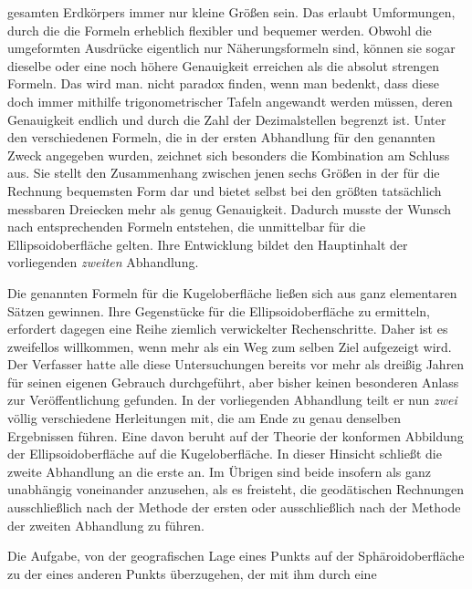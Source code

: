 %
gesamten Erdkörpers immer nur kleine Größen sein. Das erlaubt Umformungen, durch die die Formeln erheblich flexibler und bequemer werden. Obwohl die umgeformten Ausdrücke eigentlich nur Näherungsformeln sind, können sie sogar dieselbe oder eine noch höhere Genauigkeit erreichen als die absolut strengen Formeln. Das wird man. nicht paradox finden, wenn man bedenkt, dass diese doch immer mithilfe trigonometrischer Tafeln angewandt werden müssen, deren Genauigkeit endlich und durch die Zahl der Dezimalstellen begrenzt ist. Unter den verschiedenen Formeln, die in der ersten Abhandlung für den genannten Zweck angegeben wurden, zeichnet sich besonders die Kombination am Schluss aus. Sie stellt den Zusammenhang zwischen jenen sechs Größen in der für die Rechnung bequemsten Form dar und bietet selbst bei den größten tatsächlich messbaren Dreiecken mehr als genug Genauigkeit. Dadurch musste der Wunsch nach entsprechenden Formeln entstehen, die unmittelbar für die Ellipsoidoberfläche gelten. Ihre Entwicklung bildet den Hauptinhalt der vorliegenden \textit{zweiten} Abhandlung.

Die genannten Formeln für die Kugeloberfläche ließen sich aus ganz elementaren Sätzen gewinnen. Ihre Gegenstücke für die Ellipsoidoberfläche zu ermitteln, erfordert dagegen eine Reihe ziemlich verwickelter Rechenschritte. Daher ist es zweifellos willkommen, wenn mehr als ein Weg zum selben Ziel aufgezeigt wird. Der Verfasser hatte alle diese Untersuchungen bereits vor mehr als dreißig Jahren für seinen eigenen Gebrauch durchgeführt, aber bisher keinen besonderen Anlass zur Veröffentlichung gefunden. In der vorliegenden Abhandlung teilt er nun \textit{zwei} völlig verschiedene Herleitungen mit, die am Ende zu genau denselben Ergebnissen führen. Eine davon beruht auf der Theorie der konformen Abbildung der Ellipsoidoberfläche auf die Kugeloberfläche. In dieser Hinsicht schließt die zweite Abhandlung an die erste an. Im Übrigen sind beide insofern als ganz unabhängig voneinander anzusehen, als es freisteht, die geodätischen Rechnungen ausschließlich nach der Methode der ersten oder ausschließlich nach der Methode der zweiten Abhandlung zu führen.

Die Aufgabe, von der geografischen Lage eines Punkts auf der Sphäroidoberfläche zu der eines anderen Punkts überzugehen, der mit ihm durch eine %
